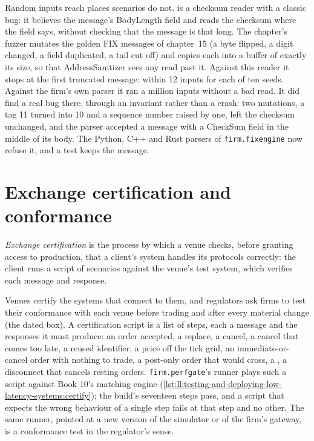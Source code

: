 Random inputs reach places scenarios do not.  is a checksum
reader with a classic bug: it believes the message's BodyLength field and reads the checksum where the field says, without
checking that the message is that long. The chapter's fuzzer mutates the golden FIX messages of chapter~15 (a byte flipped,
a digit changed, a field duplicated, a tail cut off) and copies each into a buffer of exactly its size, so that
AddressSanitizer sees any read past it. Against this reader it stops at the first truncated message: within 12 inputs for
each of ten seeds. Against the firm's own parser it ran a million inputs without a bad read. It did find a real bug there,
through an invariant rather than a crash: two mutations, a tag 11 turned into 10 and a sequence number raised by one, left the
checksum unchanged, and the parser accepted a message with a CheckSum field in the middle of its body. The Python, C++ and Rust
parsers of \texttt{firm.fixengine} now refuse it, and a test keeps the message.

\label{lst:ll:testing-and-deploying-low-latency-systems:trusting}

\section{Exchange certification and conformance}

\begin{definition}\label{def:ll:testing-and-deploying-low-latency-systems:cert}
\emph{Exchange certification} is the process by which a venue checks, before granting access to
production, that a client's system handles its protocols correctly: the client runs a script of scenarios against the venue's
test system, which verifies each message and response.
\end{definition}

Venues certify the systems that connect to them, and regulators ask firms to test their conformance with each venue before
trading and after every material change (the dated box). A certification script is a list of steps, each a message and the
responses it must produce: an order accepted, a replace, a cancel, a cancel that comes too late, a reused identifier, a price
off the tick grid, an immediate-or-cancel order with nothing to trade, a post-only order that would cross, a , a
disconnect that cancels resting orders. \texttt{firm.perfgate}'s runner plays such a script against Book 10's matching engine
(\cref{lst:ll:testing-and-deploying-low-latency-systems:certify}); the build's seventeen steps pass, and a script that expects
the wrong behaviour of a single step fails at that step and no other. The same runner, pointed at a new version of the
simulator or of the firm's gateway, is a conformance test in the regulator's sense.

